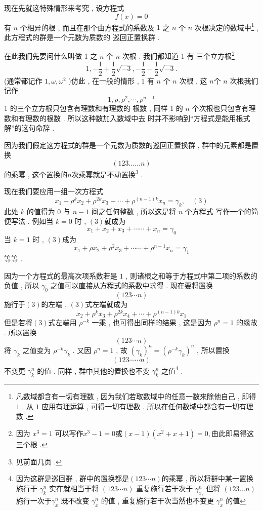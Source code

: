 现在先就这特殊情形来考究 , 设方程式
\[
f(x)=0
\]
有 $n$ 个相异的根 , 而且在那个由方程式的系数及 $1$ 之 $n$ 个 $n$ 次根决定的数域中\footnote{凡数域都含有一切有理数 , 因为我们若取数域中的任意一数来除他自己 ,  即得$1$  . 从 $1$ 应用有理运算 , 可得一切有理数 . 所以在任何数域中都含有一切有理数 . } , 此方程式的群是一个元数为质数的 巡回正置换群 . 

在此我们先要问什么叫做 1 之 $n$ 个 $n$ 次根 . 我们都知道 1 有 三个立方根\footnote{因为 $x^{3}=1 $ 可以写作$x^{3}-1=0$或$(x-1)\left(x^{2}+x+1\right)=0 , $由此即易得这三个根 . }
\[
1 , -\frac{1}{2}+\frac{1}{2} \sqrt{-3} , -\frac{1}{2}-\frac{1}{2} \sqrt{-3} . 
\]
(通常都记作 $1 ,  \omega ,  \omega^{2}$ )仿此 , 在一般的情形 ,  $1$ 有 $n$ 个 $n$ 次根 , 这 $n$个 $n$ 次根我们记作
\[
1 ,  \rho ,  \rho^{2} ,  \cdots ,  \rho^{n-1}
\]
1 的三个立方根只包含有理数和有理数的 根数 , 同样 $1$ 的 $n$ 个次根也只包含有理数和有理数的根数 . 所以这种数加入数域中去 时并不影响到“方程式是能用根式解”的这句命辞 . 

因为我们假定这方程式的群是一个元数为质数的巡回正置换群 , 群中的元素都是置换
\[(123……n)\]
的乘幂 , 这个置换的$n$次乘幂就是不动置换\footnote{见前面几页 . } . 

现在我们要应用一组一次方程式
\[
x_{1}+\rho^{k} x_{2}+\rho^{2 k} x_{3}+\cdots+\rho^{(n-1) k} x_{n}=\gamma_{k} , \quad (3)
\]
此处 $k$ 的值得为 $0$ 与 $n-1$ 间之任何整数 , 所以这是将 $n$ 个方程式
写作一个的简便写法 . 例如当 $k=0$ 时 , $(3)$就成为
\[
x_{1}+x_{2}+x_{3}+\cdots \cdots+x_{n}=\gamma_{0}
\]
当 $k=1$ 时 ,  $(3)$成为
\[
x_{1}+\rho x_{2}+\rho^{2} x_{3}+\cdots \cdots+\rho^{n-1} x_{n}=\gamma_{1}
\]
等等 . 

因为一个方程式的最高次项系数若是 $1$ , 则诸根之和等于方程式中第二项的系数的负值 , 所以 $\gamma_{0}$ 之值可以直接从方程式的系数中求得 . 现在要将置换
\[
(123 \cdots n)
\]
施行于$(3)$的左端 ,  $(3)$式左端就成为
\[
x_{2}+\rho^{k} x_{3}+\rho^{2 k} x_{4}+ \cdots+\rho^{(n-1) k} x_{1}
\]
但是若将$(3)$式左端用 $\rho^{-k}$ 一乘 , 也可得出同样的结果 , 这是因为
$\rho^{n}=1$ 的缘故 . 所以置换
\[
(123 \cdots n)
\]
将 $\gamma_{k}$ 之值变为 $\rho^{-k} \gamma_{k}$ .  又因 $\rho^{n}=1$ ,  故 $\left(\gamma_{k}\right)^{n}=\left(\rho^{-k} \gamma_{k}\right)^{n}$ ,  所以置换
\[
(123 \cdots \cdots n)
\]
不变更 $\gamma_{k}^{n}$ 的值 . 同样 , 群中其他的置换也不变 $\gamma_{k}^{n}$ 之值\footnote{因为这群是巡回群 , 群中的置换都是$(123\cdots n)$的乘幂 , 所以将群中某一置换施行于 $\gamma_{k}^{n}$ 实在就相当于将 $(123 \cdots n)$ 重复施行若干次于 $\gamma_{x_{\circ}}^{n}$ 但将 $(123 \ldots n)$施行一次于$\gamma_{x}^{n}$ 既不改变 $\gamma_{x}^{n}$ 的值 , 重复施行若干次当然也不变更 $\gamma_{x}^{n}$ 的值} . 

